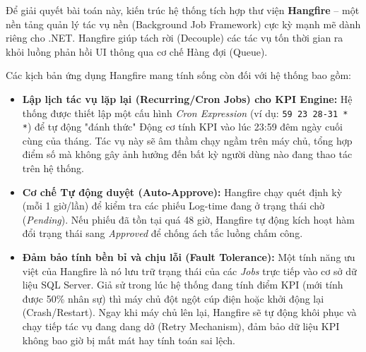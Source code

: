 \documentclass[a4paper,13.5pt]{extreport}
\begin{document}
Để giải quyết bài toán này, kiến trúc hệ thống tích hợp thư viện \textbf{Hangfire} – một nền tảng quản lý tác vụ nền (Background Job Framework) cực kỳ mạnh mẽ dành riêng cho .NET. Hangfire giúp tách rời (Decouple) các tác vụ tốn thời gian ra khỏi luồng phản hồi UI thông qua cơ chế Hàng đợi (Queue).

Các kịch bản ứng dụng Hangfire mang tính sống còn đối với hệ thống bao gồm:
\begin{itemize}
    \item \textbf{Lập lịch tác vụ lặp lại (Recurring/Cron Jobs) cho KPI Engine:} Hệ thống được thiết lập một cấu hình \textit{Cron Expression} (ví dụ: \texttt{59 23 28-31 * *}) để tự động "đánh thức" Động cơ tính KPI vào lúc 23:59 đêm ngày cuối cùng của tháng. Tác vụ này sẽ âm thầm chạy ngầm trên máy chủ, tổng hợp điểm số mà không gây ảnh hưởng đến bất kỳ người dùng nào đang thao tác trên hệ thống.
    \item \textbf{Cơ chế Tự động duyệt (Auto-Approve):} Hangfire chạy quét định kỳ (mỗi 1 giờ/lần) để kiểm tra các phiếu Log-time đang ở trạng thái chờ (\textit{Pending}). Nếu phiếu đã tồn tại quá 48 giờ, Hangfire tự động kích hoạt hàm đổi trạng thái sang \textit{Approved} để chống ách tắc luồng chấm công.
    \item \textbf{Đảm bảo tính bền bỉ và chịu lỗi (Fault Tolerance):} Một tính năng ưu việt của Hangfire là nó lưu trữ trạng thái của các \textit{Jobs} trực tiếp vào cơ sở dữ liệu SQL Server. Giả sử trong lúc hệ thống đang tính điểm KPI (mới tính được 50\% nhân sự) thì máy chủ đột ngột cúp điện hoặc khởi động lại (Crash/Restart). Ngay khi máy chủ lên lại, Hangfire sẽ tự động khôi phục và chạy tiếp tác vụ đang dang dở (Retry Mechanism), đảm bảo dữ liệu KPI không bao giờ bị mất mát hay tính toán sai lệch.
\end{itemize}
\end{document}
